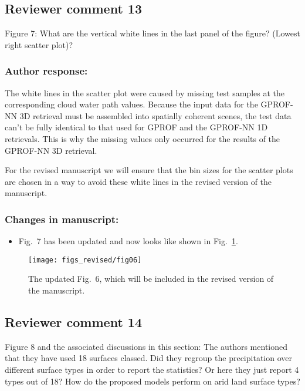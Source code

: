 \subsection*{Reviewer comment 13}

Figure 7: What are the vertical white lines in the last panel of the figure?
(Lowest right scatter plot)?

\subsubsection*{Author response:}

The white lines in the scatter plot were caused by missing test samples at the
corresponding cloud water path values. Because the input data for the GPROF-NN
3D retrieval must be assembled into spatially coherent scenes, the test data
can't be fully identical to that used for GPROF and the GPROF-NN 1D retrievals.
This is why the missing values only occurred for the results of the GPROF-NN 3D
retrieval.

For the revised manuscript we will ensure that the bin sizes for the scatter
plots are chosen in a way to avoid these white lines in the revised version of
the manuscript.

\subsubsection*{Changes in manuscript:}

\begin{itemize}
\item Fig.~7 has been updated and now looks like shown in
  Fig.~\ref{fig:results_scatter_mhs}.
\end{itemize}

\begin{figure}[hbpt]
  \centering
  \texttt{[image: figs\_revised/fig06]}
  \caption{
    The updated Fig.~6, which will be included in the revised version
    of the manuscript.
  }
  \label{fig:results_scatter_mhs}
\end{figure}

\subsection*{Reviewer comment 14}

Figure 8 and the associated discussions in this section: The authors mentioned
that they have used 18 surfaces classed. Did they regroup the precipitation
over different surface types in order to report the statistics? Or here they
just report 4 types out of 18? How do the proposed models perform on arid land
surface types?

